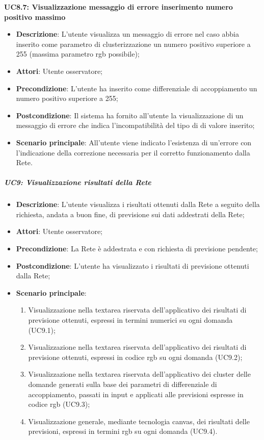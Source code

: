 \textbf{UC8.7: Visualizzazione messaggio di errore inserimento numero positivo massimo}\mbox{}
\label{UC8.7: Visualizzazione messaggio di errore per inserimento numero positivo massimo}
\noindent
\begin{itemize}
\item \textbf{Descrizione}: L'utente visualizza un messaggio di errore nel caso abbia inserito come parametro di clusterizzazione un numero positivo superiore a 255 (massima parametro rgb possibile);
\item \textbf{Attori}: Utente osservatore;
\item \textbf{Precondizione}: L'utente ha inserito come differenziale di accoppiamento un numero positivo superiore a 255;
\item \textbf{Postcondizione}: Il sistema ha fornito all'utente la visualizzazione di un messaggio di errore che indica  l'incompatibilit\`a del tipo di di valore inserito;
\item \textbf{Scenario principale}: All'utente viene indicato l'esistenza di un'errore con l'indicazione della correzione necessaria per il corretto funzionamento dalla Rete.
\end{itemize}

\subparagraph{UC9: Visualizzazione risultati della Rete}\mbox{}
\label{UC9: Visualizzazione risultati della Rete}
\noindent
\begin{itemize}
\item \textbf{Descrizione}: L'utente visualizza i risultati ottenuti dalla Rete a seguito della richiesta, andata a buon fine, di previsione sui dati addestrati della Rete;
\item \textbf{Attori}: Utente osservatore;
\item \textbf{Precondizione}: La Rete \`e addestrata e con richiesta di previsione pendente;
\item \textbf{Postcondizione}: L'utente ha visualizzato i risultati di previsione ottenuti dalla Rete; 
\item \textbf{Scenario principale}:
\begin{enumerate}
\item Visualizzazione nella textarea riservata dell'applicativo dei risultati di previsione ottenuti, espressi in termini numerici su ogni domanda (UC9.1);
\item Visualizzazione nella textarea riservata dell'applicativo dei risultati di previsione ottenuti, espressi in codice rgb su ogni domanda (UC9.2);
\item Visualizzazione nella textarea riservata dell'applicativo dei cluster delle domande generati sulla base dei parametri di differenziale di accoppiamento, passati in input e applicati alle previsioni espresse in codice rgb (UC9.3);
\item Visualizzazione generale, mediante tecnologia canvas, dei risultati delle previsioni, espressi in termini rgb su ogni domanda (UC9.4).
\end{enumerate}
\end{itemize}

